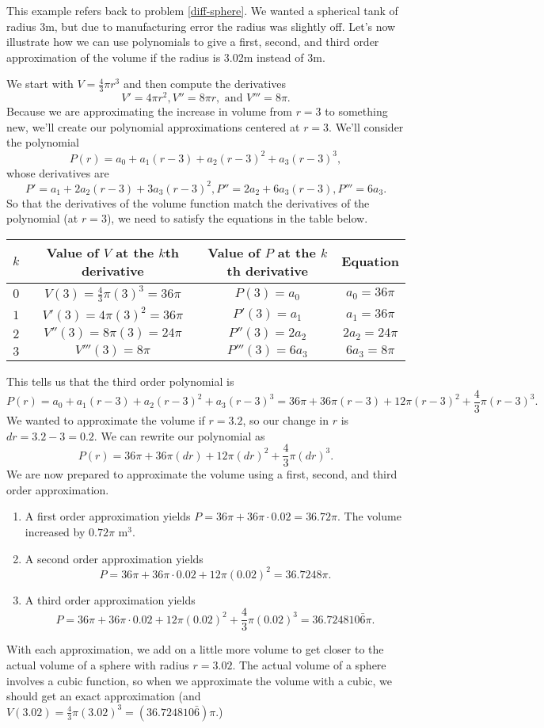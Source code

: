 \begin{example}
This example refers back to problem \ref{diff-sphere}. We wanted a spherical tank of radius 3m, but due to manufacturing error the radius was slightly off. Let's now illustrate how we can use polynomials to give a first, second, and third order approximation of the volume if the radius is 3.02m instead of 3m.  

We start with $V=\frac{4}{3} \pi r^3$ and then compute the derivatives $$V'=4\pi r^2, V''=8\pi r, \text{ and } V'''=8\pi.$$ Because we are approximating the increase in volume from $r=3$ to something new, we'll create our polynomial approximations centered at $r=3$. We'll consider the polynomial 
$$P(r)=a_0+a_1(r-3)+a_2(r-3)^2+a_3(r-3)^3,$$ 
whose derivatives are 
$$P'=a_1+2a_2(r-3)+3a_3(r-3)^2,
P''=2a_2+6a_3(r-3),
P'''=6a_3.$$
So that the derivatives of the volume function match the derivatives of the polynomial (at $r=3$), we need to satisfy the equations in the table below.
\begin{center}
\begin{tabular}{|c|c|c|c|}\hline
 $k$ & Value of $V$ at the $k$th derivative & Value of $P$ at the $k$th derivative & Equation \\ \hline
 $0$ & $V(3) = \frac{4}{3}\pi (3)^3 = 36\pi$ & $P(3) = a_0$ & $a_0=36\pi$ \\ \hline
 $1$ & $V'(3) = 4\pi (3)^2=36\pi$ & $P'(3) = a_1$ & $a_1=36\pi$ \\ \hline
 $2$ & $V''(3) = 8\pi (3)=24\pi$ & $P''(3) = 2a_2$ & $2a_2=24\pi$ \\ \hline
 $3$ & $V'''(3) = 8\pi$ & $P'''(3) = 6a_3$ & $6a_3=8\pi$ \\ \hline
\end{tabular}
\end{center}
This tells us that the third order polynomial is 
$$P(r)=a_0+a_1(r-3)+a_2(r-3)^2+a_3(r-3)^3
=36\pi+36\pi(r-3)+12\pi(r-3)^2+\frac{4}{3}\pi(r-3)^3
.$$ 
We wanted to approximate the volume if $r=3.2$, so our change in $r$ is $dr=3.2-3=0.2$.  We can rewrite our polynomial as
$$P(r)=36\pi+36\pi(dr)+12\pi(dr)^2+\frac{4}{3}\pi(dr)^3.$$
We are now prepared to approximate the volume using a first, second, and third order approximation. 
 \begin{enumerate}
 \item A first order approximation yields $P=36\pi+ 36\pi\cdot 0.02 =36.72\pi.$ The volume increased by $0.72\pi$ m$^3$. 
 \item A second order approximation yields $$P=36\pi+ 36\pi\cdot 0.02 +12\pi (0.02)^2 =36.7248\pi.$$
 \item A third order approximation yields $$P=36\pi+36\pi\cdot 0.02 +12\pi (0.02)^2+\frac{4}{3}\pi(0.02)^3  =36.724810\bar6\pi.$$
 \end{enumerate}
With each approximation, we add on a little more volume to get closer to the actual volume of a sphere with radius $r=3.02$. The actual volume of a sphere involves a cubic function, so when we approximate the volume with a cubic, we should get an exact approximation (and $ V(3.02) = \frac 43 \pi (3.02)^3 =(36.724810\bar6)\pi$.)
 \end{example}
 
